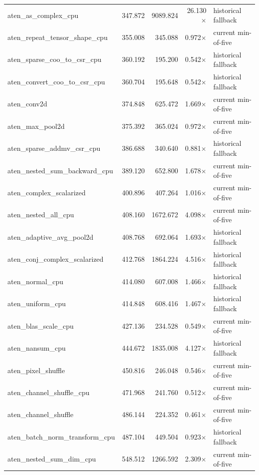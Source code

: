 \begin{longtable}{lrrrl}
  aten\_as\_complex\_cpu & 347.872 & 9089.824 & 26.130$\times$ & historical fallback \\
  aten\_repeat\_tensor\_shape\_cpu & 355.008 & 345.088 & 0.972$\times$ & current min-of-five \\
  aten\_sparse\_coo\_to\_csr\_cpu & 360.192 & 195.200 & 0.542$\times$ & historical fallback \\
  aten\_convert\_coo\_to\_csr\_cpu & 360.704 & 195.648 & 0.542$\times$ & historical fallback \\
  aten\_conv2d & 374.848 & 625.472 & 1.669$\times$ & current min-of-five \\
  aten\_max\_pool2d & 375.392 & 365.024 & 0.972$\times$ & current min-of-five \\
  aten\_sparse\_addmv\_csr\_cpu & 386.688 & 340.640 & 0.881$\times$ & historical fallback \\
  aten\_nested\_sum\_backward\_cpu & 389.120 & 652.800 & 1.678$\times$ & current min-of-five \\
  aten\_complex\_scalarized & 400.896 & 407.264 & 1.016$\times$ & current min-of-five \\
  aten\_nested\_all\_cpu & 408.160 & 1672.672 & 4.098$\times$ & current min-of-five \\
  aten\_adaptive\_avg\_pool2d & 408.768 & 692.064 & 1.693$\times$ & historical fallback \\
  aten\_conj\_complex\_scalarized & 412.768 & 1864.224 & 4.516$\times$ & historical fallback \\
  aten\_normal\_cpu & 414.080 & 607.008 & 1.466$\times$ & historical fallback \\
  aten\_uniform\_cpu & 414.848 & 608.416 & 1.467$\times$ & historical fallback \\
  aten\_blas\_scale\_cpu & 427.136 & 234.528 & 0.549$\times$ & current min-of-five \\
  aten\_nansum\_cpu & 444.672 & 1835.008 & 4.127$\times$ & historical fallback \\
  aten\_pixel\_shuffle & 450.816 & 246.048 & 0.546$\times$ & current min-of-five \\
  aten\_channel\_shuffle\_cpu & 471.968 & 241.760 & 0.512$\times$ & current min-of-five \\
  aten\_channel\_shuffle & 486.144 & 224.352 & 0.461$\times$ & current min-of-five \\
  aten\_batch\_norm\_transform\_cpu & 487.104 & 449.504 & 0.923$\times$ & historical fallback \\
  aten\_nested\_sum\_dim\_cpu & 548.512 & 1266.592 & 2.309$\times$ & current min-of-five \\

\end{longtable}
